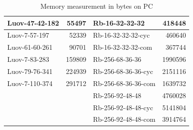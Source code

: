 \documentclass[thesis=M,english]{FITthesis}[2019/12/23]
\begin{document}
\begin{table}[]
\centering
\begin{tabular}{|l|r|l|r|}
\hline
Luov-47-42-182 & 55497 & Rb-16-32-32-32 & 418448 \\ \hline
Luov-7-57-197                         & 52339                        & Rb-16-32-32-32-cyc                    & 460640                        \\ \hline
Luov-61-60-261                        & 90701                        & Rb-16-32-32-32-com                    & 367744                        \\ \hline
Luov-7-83-283                         & 159809                       & Rb-256-68-36-36                       & 1990596                       \\ \hline
Luov-79-76-341                        & 224939                       & Rb-256-68-36-36-cyc                   & 2151116                       \\ \hline
Luov-7-110-374                        & 291712                       & Rb-256-68-36-36-com                   & 1639732                       \\ \hline
                                      &                              & Rb-256-92-48-48                       & 4760028                       \\ \hline
                                      &                              & Rb-256-92-48-48-cyc                   & 5141804                       \\ \hline
                                      &                              & Rb-256-92-48-48-com                   & 3914764                       \\ \hline
\end{tabular}
\caption{Memory measurement in bytes on PC}
\end{table}
\end{document}
